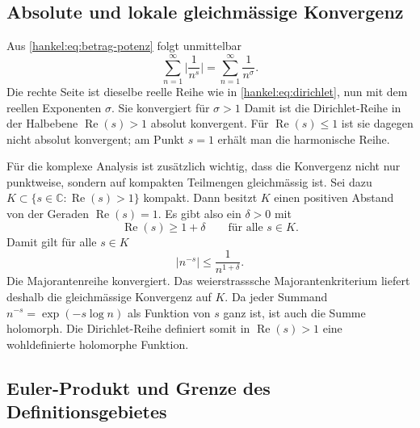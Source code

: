 \subsection{Absolute und lokale gleichmässige Konvergenz}

Aus \eqref{hankel:eq:betrag-potenz} folgt unmittelbar
\begin{equation}
\sum_{n=1}^{\infty}
\biggl|\frac{1}{n^s}\biggr|
=
\sum_{n=1}^{\infty}
\frac{1}{n^{\sigma}}.
\label{hankel:eq:betrag-reihe}
\end{equation}
Die rechte Seite ist dieselbe reelle Reihe wie in
\eqref{hankel:eq:dirichlet}, nun mit dem reellen Exponenten $\sigma$.
Sie konvergiert für $\sigma>1$ 
Damit ist die Dirichlet-Reihe in der Halbebene
$\operatorname{Re}(s)>1$ absolut konvergent. 
Für $\operatorname{Re}(s)\leq1$ ist sie dagegen nicht absolut konvergent; am
Punkt $s=1$ erhält man die harmonische Reihe.

Für die komplexe Analysis ist zusätzlich wichtig, dass die Konvergenz nicht nur punktweise, sondern auf kompakten Teilmengen gleichmässig ist. 
Sei dazu $K\subset\{s\in\mathbb C:\operatorname{Re}(s)>1\}$ kompakt. 
Dann besitzt $K$ einen positiven Abstand von der Geraden $\operatorname{Re}(s)=1$. 
Es gibt also ein $\delta>0$ mit
\begin{equation}
\operatorname{Re}(s)
\geq
1+\delta
\qquad
\text{für alle }s\in K.
\label{hankel:eq:kompakt-delta}
\end{equation}
Damit gilt für alle $s\in K$
\begin{equation}
|n^{-s}|
\leq
\frac{1}{n^{1+\delta}}.
\label{hankel:eq:weierstrass-majorante}
\end{equation}
Die Majorantenreihe konvergiert. 
Das weierstrasssche Majorantenkriterium liefert deshalb die gleichmässige Konvergenz auf $K$. 
Da jeder Summand $n^{-s}=\exp(-s\log n)$ als Funktion von $s$ ganz ist, ist auch die Summe holomorph. 
Die Dirichlet-Reihe definiert somit in $\operatorname{Re}(s)>1$ eine wohldefinierte holomorphe Funktion.

\subsection{Euler-Produkt und Grenze des Definitionsgebietes}

